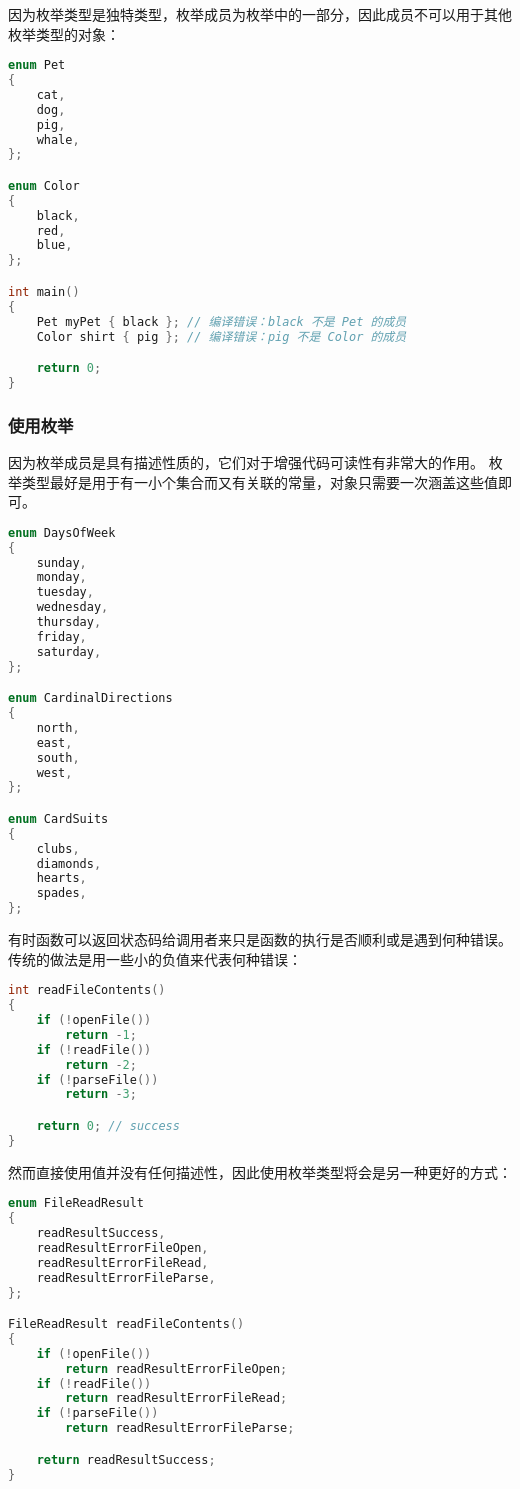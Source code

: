 \documentclass[../../LearnCpp.tex]{subfiles}
\begin{document}
因为枚举类型是独特类型，枚举成员为枚举中的一部分，因此成员不可以用于其他枚举类型的对象：

\begin{lstlisting}[language=C++]
enum Pet
{
    cat,
    dog,
    pig,
    whale,
};

enum Color
{
    black,
    red,
    blue,
};

int main()
{
    Pet myPet { black }; // 编译错误：black 不是 Pet 的成员
    Color shirt { pig }; // 编译错误：pig 不是 Color 的成员

    return 0;
}
\end{lstlisting}

\subsubsection*{使用枚举}

因为枚举成员是具有描述性质的，它们对于增强代码可读性有非常大的作用。
枚举类型最好是用于有一小个集合而又有关联的常量，对象只需要一次涵盖这些值即可。

\begin{lstlisting}[language=C++]
enum DaysOfWeek
{
    sunday,
    monday,
    tuesday,
    wednesday,
    thursday,
    friday,
    saturday,
};

enum CardinalDirections
{
    north,
    east,
    south,
    west,
};

enum CardSuits
{
    clubs,
    diamonds,
    hearts,
    spades,
};
\end{lstlisting}

有时函数可以返回状态码给调用者来只是函数的执行是否顺利或是遇到何种错误。
传统的做法是用一些小的负值来代表何种错误：

\begin{lstlisting}[language=C++]
int readFileContents()
{
    if (!openFile())
        return -1;
    if (!readFile())
        return -2;
    if (!parseFile())
        return -3;

    return 0; // success
}
\end{lstlisting}

然而直接使用值并没有任何描述性，因此使用枚举类型将会是另一种更好的方式：

\begin{lstlisting}[language=C++]
enum FileReadResult
{
    readResultSuccess,
    readResultErrorFileOpen,
    readResultErrorFileRead,
    readResultErrorFileParse,
};

FileReadResult readFileContents()
{
    if (!openFile())
        return readResultErrorFileOpen;
    if (!readFile())
        return readResultErrorFileRead;
    if (!parseFile())
        return readResultErrorFileParse;

    return readResultSuccess;
}
\end{lstlisting}
\end{document}
